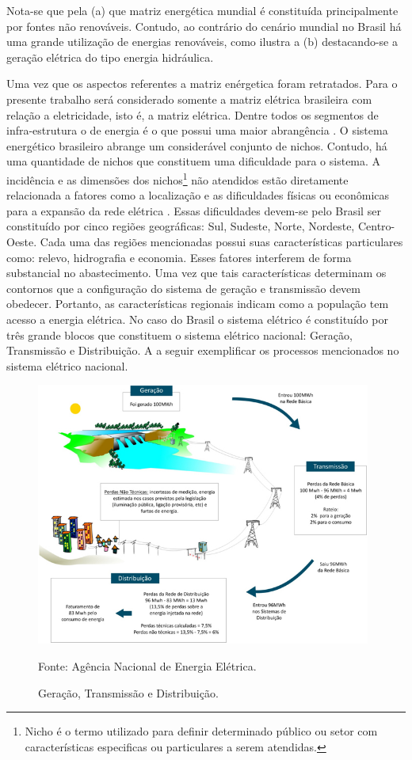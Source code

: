 Nota-se que pela (a) que matriz energ\'etica mundial \'e constitu\'ida principalmente por fontes n\~ao
renov\'aveis. Contudo, ao contr\'ario do cen\'ario mundial no Brasil h\'a uma grande utiliza\c c\~ao de energias
renov\'aveis, como ilustra a (b) destacando-se a gera\c c\~ao el\'etrica do tipo energia
hidr\'aulica.

Uma vez que os aspectos referentes a matriz en\'ergetica foram retratados. Para o presente trabalho ser\'a considerado
somente a matriz el\'etrica brasileira com rela\c c\~ao a eletricidade, isto \'e, a matriz el\'etrica. Dentre todos
os segmentos de infra-estrutura o de energia \'e o que possui uma maior abrang\^encia \cite{an}. O sistema
energ\'etico brasileiro abrange um consider\'avel conjunto de nichos. Contudo, h\'a uma quantidade de nichos que
constituem uma dificuldade para o sistema. A incid\^encia e as dimens\~oes dos nichos\footnote {Nicho \'e o termo utilizado para
definir determinado p\'ublico ou setor com caracter\'isticas especificas ou particulares a serem atendidas.} n\~ao atendidos est\~ao diretamente
relacionada a fatores como a localiza\c c\~ao e as dificuldades f\'isicas ou econ\^omicas para a expans\~ao da rede
el\'etrica \cite{an}. Essas dificuldades devem-se pelo Brasil ser constitu\'ido por cinco regi\~oes geogr\'aficas: Sul,
Sudeste, Norte, Nordeste, Centro-Oeste. Cada uma das regi\~oes mencionadas possui suas caracter\'isticas particulares
como: relevo, hidrografia e economia. Esses fatores interferem de forma substancial no abastecimento. Uma vez
que tais caracter\'isticas determinam os contornos que a configura\c c\~ao do sistema de gera\c c\~ao e transmiss\~ao devem 
obedecer\cite{an}. Portanto, as caracter\'isticas regionais indicam como a popula\c c\~ao tem acesso a energia
el\'etrica. No caso do Brasil o sistema el\'etrico \'e constitu\'ido por tr\^es grande blocos que constituem o sistema
el\'etrico nacional: Gera\c c\~ao, Transmiss\~ao e Distribui\c c\~ao. A  a seguir exemplificar os processos
mencionados no sistema el\'etrico nacional.

\begin{figure}[!h]
	\centering
	\includegraphics[width=11cm]{material/perdas.jpg}
	\caption[Gera\c c\~ao, Transmiss\~ao e Distribui\c c\~ao. ]{Gera\c c\~ao, Transmiss\~ao e Distribui\c c\~ao.}{Fonte: Ag\^encia Nacional de Energia El\'etrica.}
	\label{energia} 
\end{figure}


